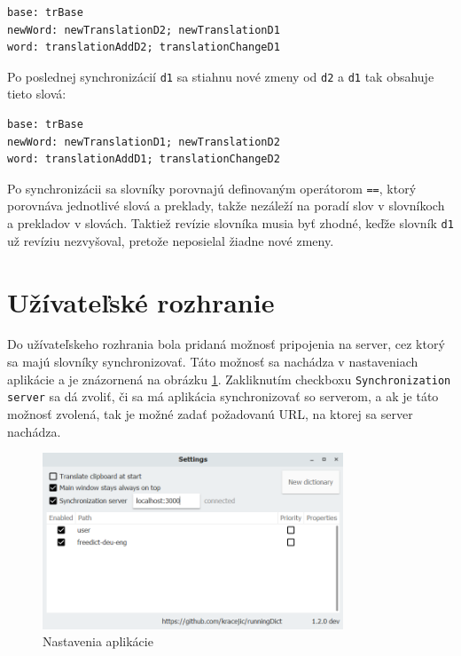 \documentclass[
  digital, %
  table,   %
  lof,     %
  lot,     %
]{fithesis3}
\begin{document}
\begin{lstlisting}[basicstyle=\small]
base: trBase
newWord: newTranslationD2; newTranslationD1
word: translationAddD2; translationChangeD1
\end{lstlisting}

Po poslednej synchronizácií \texttt{d1} sa stiahnu nové zmeny od \texttt{d2} a \texttt{d1} tak obsahuje tieto slová:

\begin{lstlisting}[basicstyle=\small]
base: trBase
newWord: newTranslationD1; newTranslationD2
word: translationAddD1; translationChangeD2
\end{lstlisting}

Po synchronizácii sa slovníky porovnajú definovaným operátorom \texttt{==}, ktorý porovnáva jednotlivé slová a preklady, takže nezáleží na poradí slov v slovníkoch a prekladov v slovách. Taktiež revízie slovníka musia byť zhodné, keďže slovník \texttt{d1} už revíziu nezvyšoval, pretože neposielal žiadne nové zmeny.

\section{Užívateľské rozhranie}
Do užívateľskeho rozhrania bola pridaná možnosť pripojenia na server, cez ktorý sa majú slovníky synchronizovať. Táto možnosť sa nachádza v nastaveniach aplikácie a je znázornená na obrázku \ref{fig:desktop-settings}. Zakliknutím checkboxu \texttt{Synchronization server} sa dá zvoliť, či sa má aplikácia synchronizovať so serverom, a ak je táto možnosť zvolená, tak je možné zadať požadovanú URL, na ktorej sa server nachádza.
\begin{figure}
	\begin{center}
	\includegraphics[width=0.8\textwidth]{img/desktop-settings.png}
	\end{center}
    \caption{Nastavenia aplikácie}
	\label{fig:desktop-settings}
\end{figure}
\end{document}
